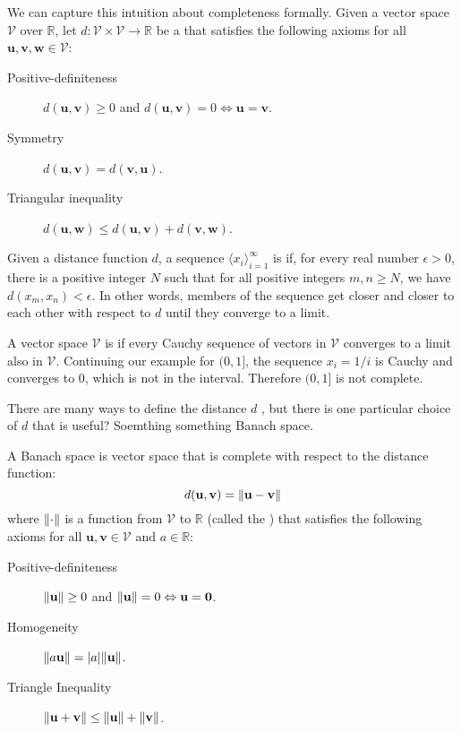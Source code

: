 We can capture this intuition about completeness formally. Given a vector space $\mathcal{V}$ over $\mathbb{R}$, let $d : \mathcal{V} \times \mathcal{V} \to \mathbb{R}$ be a  that satisfies the following axioms for all $\mathbf{u}, \mathbf{v}, \mathbf{w} \in \mathcal{V}$:
%
\begin{description}
  \item[Positive-definiteness] $d(\mathbf{u}, \mathbf{v}) \geq 0$ and $d(\mathbf{u}, \mathbf{v}) = 0 \Leftrightarrow \mathbf{u} = \mathbf{v}$.
  \item[Symmetry] $d(\mathbf{u}, \mathbf{v}) = d(\mathbf{v}, \mathbf{u})$.
  \item[Triangular inequality] $d(\mathbf{u}, \mathbf{w}) \leq d(\mathbf{u}, \mathbf{v}) + d(\mathbf{v}, \mathbf{w})$.
\end{description}
%
Given a distance function $d$, a sequence $\langle x_i \rangle_{i=1}^\infty$ is  if, for every real number $\epsilon > 0$, there is a positive integer $N$ such that for all positive integers $m, n \geq N$, we have $d(x_m, x_n) < \epsilon$. In other words, members of the sequence get closer and closer to each other with respect to $d$ until they converge to a limit.

A vector space $\mathcal{V}$ is  if every Cauchy sequence of vectors in $\mathcal{V}$ converges to a limit also in $\mathcal{V}$. Continuing our example for $(0, 1]$, the sequence $x_i = 1 / i$ is Cauchy and converges to $0$, which is not in the interval. Therefore $(0, 1]$ is not complete.

There are many ways to define the distance $d$ , but there is one particular choice of $d$ that is useful? Soemthing something Banach space.
%
\begin{definition}
A Banach space is vector space that is complete with respect to the distance function:
\begin{equation}
  d(\mathbf{u}, \mathbf{v}) = \lVert\mathbf{u} - \mathbf{v}\rVert
\end{equation}
where $\lVert\cdot\rVert$ is a function from $\mathcal{V}$ to $\mathbb{R}$ (called the ) that satisfies the following axioms for all $\mathbf{u}, \mathbf{v} \in \mathcal{V}$ and $a \in \mathbb{R}$:
\begin{description}
  \item[Positive-definiteness] $\lVert\mathbf{u}\rVert \geq 0$ and $\lVert\mathbf{u}\rVert = 0 \Leftrightarrow \mathbf{u} = \mathbf{0}$.
  \item[Homogeneity] $\lVert a \mathbf{u}\rVert = \lvert a\rvert \lVert\mathbf{u}\rVert$.
  \item[Triangle Inequality] $\lVert\mathbf{u} + \mathbf{v}\rVert \leq \lVert\mathbf{u}\rVert + \lVert\mathbf{v}\rVert$.
\end{description}
\end{definition}

